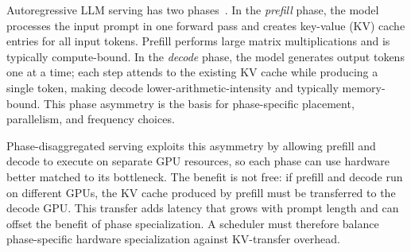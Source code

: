 Autoregressive LLM serving has two phases~\cite{agrawal2024taming}. 
In the \emph{prefill} phase, the model processes the input prompt in one forward pass and creates key-value (KV) cache entries for all input tokens. 
Prefill performs large matrix multiplications and is typically compute-bound. 
In the \emph{decode} phase, the model generates output tokens one at a time; each step attends to the existing KV cache while producing a single token, making decode lower-arithmetic-intensity and typically memory-bound. 
This phase asymmetry is the basis for phase-specific placement, parallelism, and frequency choices.

Phase-disaggregated serving exploits this asymmetry by allowing prefill and decode to execute on separate GPU resources, so each phase can use hardware better matched to its bottleneck. 
The benefit is not free: if prefill and decode run on different GPUs, the KV cache produced by prefill must be transferred to the decode GPU. 
This transfer adds latency that grows with prompt length and can offset the benefit of phase specialization. 
A scheduler must therefore balance phase-specific hardware specialization against KV-transfer overhead.


